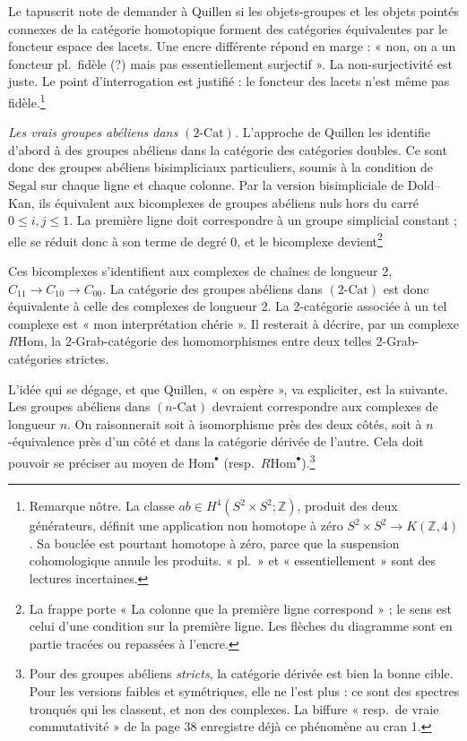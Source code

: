 \documentclass[11pt,a4paper]{article}
\begin{document}
Le tapuscrit note de demander à Quillen si les objets-groupes et les objets
pointés connexes de la catégorie homotopique forment des catégories
équivalentes par le foncteur espace des lacets. Une encre différente répond en
marge : « non, on a un foncteur pl.\ fidèle (?) mais pas essentiellement
surjectif ». La non-surjectivité est juste. Le point d'interrogation est
justifié : le foncteur des lacets n'est même pas fidèle.\footnote{Remarque
nôtre. La classe $ab \in H^{4}(S^{2} \times S^{2}; \mathbb{Z})$, produit des
deux générateurs, définit une application non homotope à zéro $S^{2} \times
S^{2} \to K(\mathbb{Z}, 4)$. Sa bouclée est pourtant homotope à zéro, parce
que la suspension cohomologique annule les produits. « pl.\ » et
« essentiellement » sont des lectures incertaines.}

\emph{Les vrais groupes abéliens dans $(2\text{-Cat})$.} L'approche de Quillen
les identifie d'abord à des groupes abéliens dans la catégorie des catégories
doubles. Ce sont donc des groupes abéliens bisimpliciaux particuliers,
soumis à la condition de Segal sur chaque ligne et chaque colonne. Par la
version bisimpliciale de Dold--Kan, ils équivalent aux bicomplexes de groupes
abéliens nuls hors du carré $0 \leq i, j \leq 1$. La première ligne doit
correspondre à un groupe simplicial constant ; elle se réduit donc à son terme
de degré 0, et le bicomplexe devient\footnote{La frappe porte « La colonne que
la première ligne correspond » ; le sens est celui d'une condition sur la
première ligne. Les flèches du diagramme sont en partie tracées ou repassées à
l'encre.}


Ces bicomplexes s'identifient aux complexes de chaînes de longueur 2,
$C_{11} \to C_{10} \to C_{00}$. La catégorie des groupes abéliens dans
$(2\text{-Cat})$ est donc équivalente à celle des complexes de longueur 2. La
2-catégorie associée à un tel complexe est « mon interprétation chérie ». Il
resterait à décrire, par un complexe $R\mathrm{Hom}$, la 2-Grab-catégorie des
homomorphismes entre deux telles 2-Grab-catégories strictes.

L'idée qui se dégage, et que Quillen, « on espère », va expliciter, est la
suivante. Les groupes abéliens dans $(n\text{-Cat})$ devraient correspondre
aux complexes de longueur $n$. On raisonnerait soit à isomorphisme près des deux
côtés, soit à $n$-équivalence près d'un côté et dans la catégorie dérivée de
l'autre. Cela doit pouvoir se préciser au moyen de $\mathrm{Hom}^{\bullet}$
(resp.\ $R\mathrm{Hom}^{\bullet}$).\footnote{Pour des groupes abéliens
\emph{stricts}, la catégorie dérivée est bien la bonne cible. Pour les
versions faibles et symétriques, elle ne l'est plus : ce sont des spectres
tronqués qui les classent, et non des complexes. La biffure « resp.\ de vraie
commutativité » de la page 38 enregistre déjà ce phénomène au cran 1.}
\end{document}
